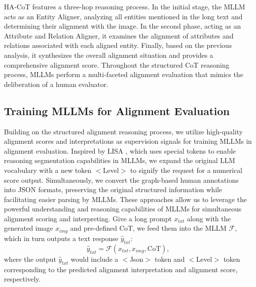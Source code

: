 \documentclass[letterpaper]{article} %
\begin{document}
HA-CoT features a three-hop reasoning process. In the initial stage, the MLLM acts as an Entity Aligner, analyzing all entities mentioned in the long text and determining their alignment with the image. In the second phase, acting as an Attribute and Relation Aligner, it examines the alignment of attributes and relations associated with each aligned entity. Finally, based on the previous analysis, it synthesizes the overall alignment situation and provides a comprehensive alignment score. Throughout the structured CoT reasoning process, MLLMs perform a multi-faceted alignment evaluation that mimics the deliberation of a human evaluator.

\subsection{Training MLLMs for Alignment Evaluation}

Building on the structured alignment reasoning process, we utilize high-quality alignment scores and interpretations as supervision signals for training MLLMs in alignment evaluation. Inspired by LISA \cite{lai2024lisa, sheng2025instructcrop}, which uses special tokens to enable reasoning segmentation capabilities in MLLMs, we expand the original LLM vocabulary with a new token $<$Level$>$ to signify the request for a numerical score output. Simultaneously, we convert the graph-based human annotations into JSON formats, preserving the original structured information while facilitating easier parsing by MLLMs. These approaches allow us to leverage the powerful understanding and reasoning capabilities of MLLMs for simultaneous alignment scoring and interpreting. Give a long prompt $x_{txt}$ along with the generated image $ x_{img}$ and pre-defined CoT, we feed them into the MLLM $\mathcal{F}$, which in turn outputs a text response $\hat{y} _{txt}$:
\begin{equation}
	\hat{y} _{txt} = \mathcal{F}\left ( x_{txt}, x_{img}, \text{CoT} \right ),
\end{equation}
where the output $\hat{y} _{txt}$ would include a $<$Json$>$ token and $<$Level$>$ token corresponding to the predicted alignment interpretation and alignment score, respectively.
\end{document}
